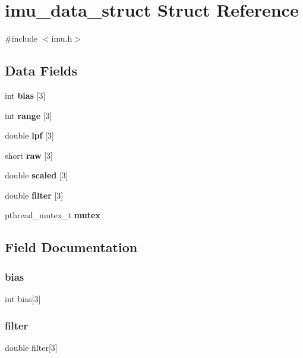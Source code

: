 \section{imu\+\_\+data\+\_\+struct Struct Reference}
\label{structimu__data__struct}


{\ttfamily \#include $<$imu.\+h$>$}

\subsection*{Data Fields}
\begin{DoxyCompactItemize}
\item 
int \textbf{ bias} [3]
\item 
int \textbf{ range} [3]
\item 
double \textbf{ lpf} [3]
\item 
short \textbf{ raw} [3]
\item 
double \textbf{ scaled} [3]
\item 
double \textbf{ filter} [3]
\item 
pthread\+\_\+mutex\+\_\+t \textbf{ mutex}
\end{DoxyCompactItemize}


\subsection{Field Documentation}
\mbox{\label{structimu__data__struct_af2d75ce8d5305d9c3a7cbb77e8e1dc73}} 
\subsubsection{bias}
{\footnotesize\ttfamily int bias[3]}

\mbox{\label{structimu__data__struct_aeff295a82e4faf9846a248f0d8d6248b}} 
\subsubsection{filter}
{\footnotesize\ttfamily double filter[3]}

\mbox{\label{structimu__data__struct_a8d50dca4d27ae3a6cdc0505575fe2381}} 
